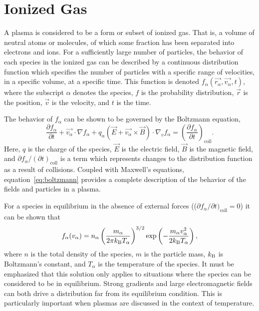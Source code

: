 \section{Ionized Gas}
A plasma is considered to be a form or subset of ionized gas. That is, a volume
of neutral atoms or molecules, of which some fraction has been separated into
electrons and ions. For a sufficiently large number of particles, the behavior
of each species in the ionized gas can be described by a continuous distribution
function which specifies the number of particles with a specific range of
velocities, in a specific volume, at a specific time. This function is denoted
$f_\alpha(\vec{r_\alpha}, \vec{v_\alpha}, t)$, where the subscript $\alpha$
denotes the species, $f$ is the probability distribution, $\vec{r}$ is the
position, $\vec{v}$ is the velocity, and $t$ is the time.

The behavior of $f_\alpha$ can be shown to be governed by the Boltzmann
equation,
\begin{equation}\label{eq:boltzmann}
  \frac{\partial f_\alpha}{\partial t} + \vec{v_\alpha}\cdot\nabla f_\alpha +
  q_\alpha \left(\vec{E} + \vec{v_\alpha}\times\vec{B}\right)
  \cdot \nabla_v f_\alpha = \left( \frac{\partial f_\alpha}
  {\partial t}\right)_\mathrm{coll}.
\end{equation}
Here, $q$ is the charge of the species, $\vec{E}$ is the electric field,
$\vec{B}$ is the magnetic field, and $\partial f_\alpha/(\partial
t)_\mathrm{coll}$ is a term which represents changes to the distribution
function as a result of collisions. Coupled with Maxwell's equations,
equation~\ref{eq:boltzmann} provides a complete description of the behavior of
the fields and particles in a plasma.

For a species in equilibrium in the absence of external forces (($\partial
f_\alpha/\partial t)_\mathrm{coll} = 0$) it can be shown that
\begin{equation}\label{eq:mb}
  f_\alpha(v_\alpha) =
    n_\alpha\left( \frac{m_\alpha}{2\pi k_\mathrm{B} T_\alpha}\right)^{3/2}
   \exp\left(-\frac{m_\alpha v_\alpha^2}{2k_\mathrm{B} T_\alpha}\right),
\end{equation}
where $n$ is the total density of the species, $m$ is the particle mass, $k_\mathrm{B}$
is Boltzmann's constant, and $T_\alpha$ is the temperature of the species. It
must be emphasized that this solution only applies to situations where the
species can be considered to be in equilibrium. Strong gradients and large
electromagnetic fields can both drive a distribution far from its equilibrium
condition. This is particularly important when plasmas are discussed in the
context of temperature.

